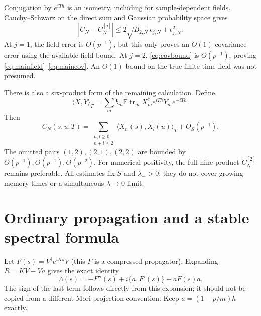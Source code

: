 \documentclass[11pt,a4paper]{article}
\newcommand{\EE}{\mathbb E}
\newcommand{\tr}{\operatorname{tr}}
\begin{document}
Conjugation by $e^{iTh}$ is an isometry, including for sample-dependent
fields. Cauchy--Schwarz on the direct sum and Gaussian probability
space gives
\begin{equation}
 |C_N-C_N^{[j]}|\leq
 2\sqrt{B_{2,N}}\,\epsilon_{j,N}+\epsilon_{j,N}^2.\label{eq:covbound}
\end{equation}
At $j=1$, the field error is $O(p^{-1})$, but this only proves
an $O(1)$ covariance error using the available field bound.
At $j=2$, \eqref{eq:covbound} is $O(p^{-1})$, proving
\eqref{eq:mainfield}--\eqref{eq:maincov}. An $O(1)$ bound on
the true finite-time field was not presumed.

There is also a six-product form of the remaining calculation.
Define
\[
 \langle X,Y\rangle_T=\sum_m b_m\EE\tr_m
 X_m^\dagger e^{iTh}Y_me^{-iTh}.
\]
Then
\begin{equation}
 C_N(s,u;T)=
 \sum_{\substack{n,l\geq0\\n+l\leq2}}
 \langle X_n(s),X_l(u)\rangle_T+O_S(p^{-1}).\label{eq:six}
\end{equation}
The omitted pairs $(1,2),(2,1),(2,2)$ are bounded by
$O(p^{-1}),O(p^{-1}),O(p^{-2})$. For numerical positivity,
the full nine-product $C_N^{[2]}$ remains preferable.
All estimates fix $S$ and $\lambda_->0$; they do not cover
growing memory times or a simultaneous $\lambda\to0$ limit.

\newpage
\section{Ordinary propagation and a stable spectral formula}
Let $F(s)=V^\dagger e^{iKs}V$ (this $F$ is a compressed propagator).
Expanding $R=KV-Va$ gives the exact identity
\begin{equation}
 \Lambda(s)=-F''(s)+i\{a,F'(s)\}+aF(s)a.\label{eq:derivative}
\end{equation}
The sign of the last term follows directly from this expansion;
it should not be copied from a different Mori projection convention.
Keep $a=(1-p/m)h$ exactly.
\end{document}

